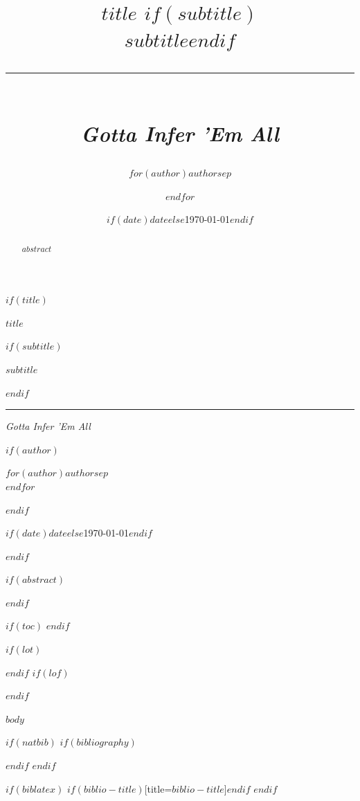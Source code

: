 \documentclass[$if(fontsize)$$fontsize$,$endif$$if(lang)$$babel-lang$,$endif$$if(papersize)$$papersize$,$endif$$for(classoption)$$classoption$$sep$,$endfor$]{$documentclass$}
\title{%
  \vspace{2cm}%
  {\fontsize{36}{42}\selectfont\bfseries\color{KantoDark}$title$}%
  $if(subtitle)$\\[12pt]{\fontsize{18}{24}\selectfont\color{KantoGray}$subtitle$}$endif$%
  \\[2cm]%
  {\color{KantoRed}\rule{\textwidth}{3pt}}%
  \\[1cm]%
  {\Large\color{KantoBlue}\textit{Gotta Infer 'Em All}}%
}
\author{%
  $for(author)$$author$$sep$ \and $endfor$%
}
\date{$if(date)$$date$$else$\today$endif$}
\begin{document}
$if(title)$
\begin{titlepage}
\centering
\vspace*{3cm}
{\fontsize{42}{50}\selectfont\bfseries\color{KantoDark}$title$\par}
\vspace{0.5cm}
$if(subtitle)$
{\fontsize{18}{24}\selectfont\color{KantoGray}$subtitle$\par}
\vspace{0.5cm}
$endif$
{\color{KantoRed}\rule{0.6\textwidth}{3pt}\par}
\vspace{1cm}
{\Large\color{KantoBlue}\textit{Gotta Infer 'Em All}\par}
\vspace{2cm}
$if(author)$
{\Large
$for(author)$$author$$sep$ \\ $endfor$
\par}
$endif$
\vfill
{\large $if(date)$$date$$else$\today$endif$\par}
\end{titlepage}
$endif$

$if(abstract)$
\begin{abstract}
$abstract$
\end{abstract}
$endif$

$if(toc)$
{
\setcounter{tocdepth}{$toc-depth$}
\tableofcontents
\newpage
}
$endif$

$if(lot)$\listoftables\newpage$endif$
$if(lof)$\listoffigures\newpage$endif$

$body$

$if(natbib)$
$if(bibliography)$

$endif$
$endif$

$if(biblatex)$
\printbibliography$if(biblio-title)$[title=$biblio-title$]$endif$
$endif$
\end{document}

